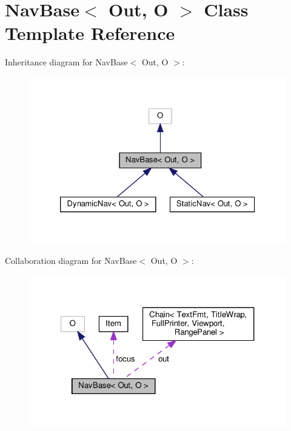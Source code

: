 \hypertarget{classNavBase}{}\section{Nav\+Base$<$ Out, O $>$ Class Template Reference}
\label{classNavBase}


Inheritance diagram for Nav\+Base$<$ Out, O $>$\+:\nopagebreak
\begin{figure}[H]
\begin{center}
\leavevmode
\includegraphics[width=326pt]{classNavBase__inherit__graph}
\end{center}
\end{figure}


Collaboration diagram for Nav\+Base$<$ Out, O $>$\+:\nopagebreak
\begin{figure}[H]
\begin{center}
\leavevmode
\includegraphics[width=321pt]{classNavBase__coll__graph}
\end{center}
\end{figure}
